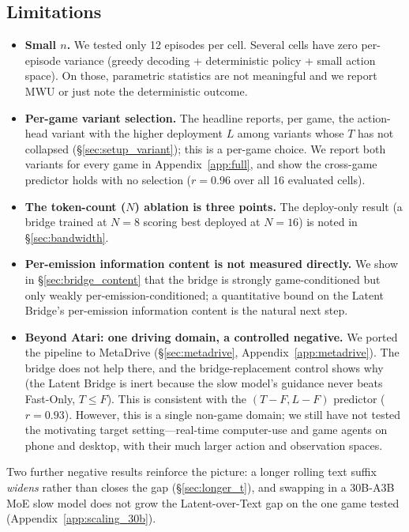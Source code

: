\documentclass[11pt]{article}
\begin{document}
\subsection{Limitations}

\begin{itemize}[topsep=0pt,itemsep=0pt,leftmargin=*]
\item \textbf{Small $n$.} We tested only 12 episodes per cell. Several cells have zero per-episode variance (greedy decoding + deterministic policy + small action space). On those, parametric statistics are not meaningful and we report MWU or just note the deterministic outcome.
\item \textbf{Per-game variant selection.} The headline reports, per game, the action-head variant with the higher deployment $L$ among variants whose $T$ has not collapsed (\S\ref{sec:setup_variant}); this is a per-game choice. We report both variants for every game in Appendix~\ref{app:full}, and show the cross-game predictor holds with no selection ($r=0.96$ over all 16 evaluated cells).
\item \textbf{The token-count ($N$) ablation is three points.} The deploy-only result (a bridge trained at $N\!=\!8$ scoring best deployed at $N\!=\!16$) is noted in \S\ref{sec:bandwidth}.
\item \textbf{Per-emission information content is not measured directly.} We show in \S\ref{sec:bridge_content} that the bridge is strongly game-conditioned but only weakly per-emission-conditioned; a quantitative bound on the Latent Bridge's per-emission information content is the natural next step.
\item \textbf{Beyond Atari: one driving domain, a controlled negative.} We ported the pipeline to MetaDrive (\S\ref{sec:metadrive}, Appendix~\ref{app:metadrive}). The bridge does not help there, and the bridge-replacement control shows why (the Latent Bridge is inert because the slow model's guidance never beats Fast-Only, $T\!\le\!F$). This is consistent with the $(T\!-\!F, L\!-\!F)$ predictor ($r=0.93$). However, this is a single non-game domain; we still have not tested the motivating target setting---real-time computer-use and game agents on phone and desktop, with their much larger action and observation spaces.
\end{itemize}

Two further negative results reinforce the picture: a longer rolling text suffix \emph{widens}
rather than closes the gap (\S\ref{sec:longer_t}), and swapping in a 30B-A3B MoE slow model does not
grow the Latent-over-Text gap on the one game tested (Appendix~\ref{app:scaling_30b}).
\end{document}
